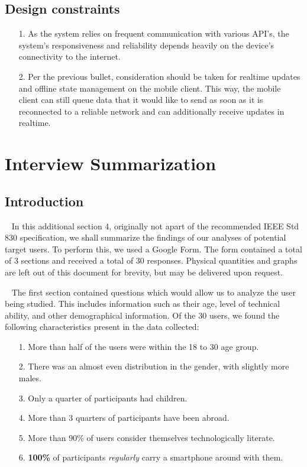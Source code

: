 \documentclass{scrreprt}
\begin{document}
\section{Design constraints}
\begin{enumerate}
	\item[1.] As the system relies on frequent communication with various API's, the system's responsiveness and reliability depends heavily on the device's connectivity to the internet.
	\item[2.] Per the previous bullet, consideration should be taken for realtime updates and offline state management on the mobile client. This way, the mobile client can still queue data that it would like to send as soon as it is reconnected to a reliable network and can additionally receive updates in realtime.
\end{enumerate}


\chapter{Interview Summarization}
\section{Introduction}
\par ~ In this additional section 4, originally not apart of the recommended IEEE Std 830 specification, we shall summarize the findings of our analyses of potential target users. To perform this, we used a Google Form. The form contained a total of 3 sections and received a total of 30 responses. Physical quantities and graphs are left out of this document for brevity, but may be delivered upon request.

\par ~ The first section contained questions which would allow us to analyze the user being studied. This includes information such as their age, level of technical ability, and other demographical information. Of the 30 users, we found the following characteristics present in the data collected:
\begin{enumerate}
	\item[1.] More than half of the users were within the 18 to 30 age group.
	\item[2.] There was an almost even distribution in the gender, with slightly more males.
	\item[3.] Only a quarter of participants had children.
	\item[4.] More than 3 quarters of participants have been abroad.
	\item[5.] More than 90\% of users consider themselves technologically literate.
	\item[6.] \textbf{100\%} of participants \emph{regularly} carry a smartphone around with them.
\end{enumerate}
\end{document}
